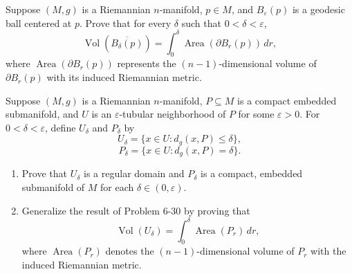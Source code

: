 \begin{exercise}
\label{prob:volume-geodesic-ball}

Suppose $(M, g)$ is a Riemannian $n$-manifold, $p \in M$, and $B_\varepsilon(p)$ is a geodesic ball centered at $p$. Prove that for every $\delta$ such that $0 < \delta < \varepsilon$,
\[
\operatorname{Vol}\left(\overline{B_\delta(p)}\right) = \int_0^\delta \operatorname{Area}(\partial B_r(p)) \, dr,
\]
where $\operatorname{Area}(\partial B_r(p))$ represents the $(n-1)$-dimensional volume of $\partial B_r(p)$ with its induced Riemannian metric.
\end{exercise}

\begin{exercise}
\label{prob:tubular-neighborhood-volume}

Suppose $(M, g)$ is a Riemannian $n$-manifold, $P \subseteq M$ is a compact embedded submanifold, and $U$ is an $\varepsilon$-tubular neighborhood of $P$ for some $\varepsilon > 0$. For $0 < \delta < \varepsilon$, define $U_\delta$ and $P_\delta$ by
\[
U_\delta = \{x \in U : d_g(x, P) \leq \delta\},
\]
\[
P_\delta = \{x \in U : d_g(x, P) = \delta\}.
\]
\begin{enumerate}
\item[(a)] Prove that $U_\delta$ is a regular domain and $P_\delta$ is a compact, embedded submanifold of $M$ for each $\delta \in (0, \varepsilon)$.
\item[(b)] Generalize the result of Problem 6-30 by proving that
\[
\operatorname{Vol}(U_\delta) = \int_0^\delta \operatorname{Area}(P_r) \, dr,
\]
where $\operatorname{Area}(P_r)$ denotes the $(n-1)$-dimensional volume of $P_r$ with the induced Riemannian metric.
\end{enumerate}
\end{exercise}

